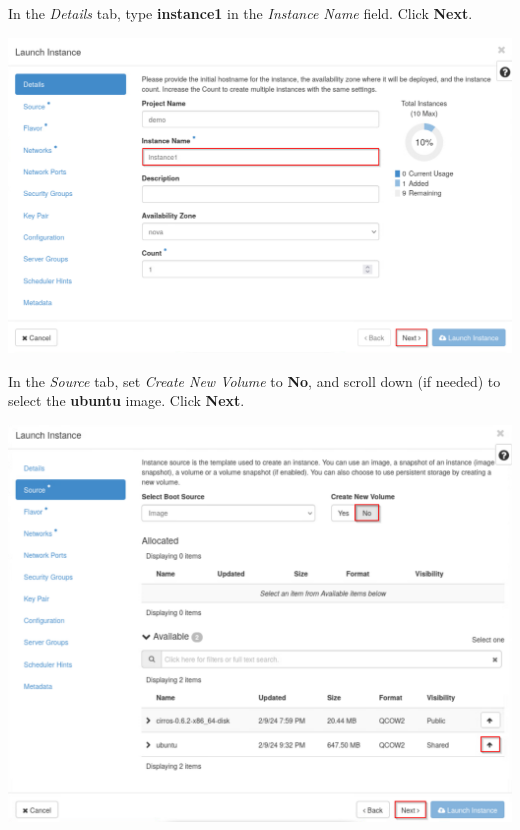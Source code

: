 \documentclass[letterpaper, 12pt]{article}
\begin{document}
\begin{enumerate}
    \begin{labstep}
        In the \textit{Details} tab, type \textbf{instance1} in the \textit{Instance Name} field.
        Click \textbf{Next}.

        \begin{center}
            \includegraphics[width=\linewidth]{images/part4/step7.png}
        \end{center}
    \end{labstep}

    \begin{labstep}
        In the \textit{Source} tab, set \textit{Create New Volume} to \textbf{No}, and scroll down (if needed) to select the \textbf{ubuntu} image.
        Click \textbf{Next}.

        \begin{center}
            \includegraphics[width=\linewidth]{images/part4/step8.png}
        \end{center}
    \end{labstep}


\end{enumerate}
\end{document}
